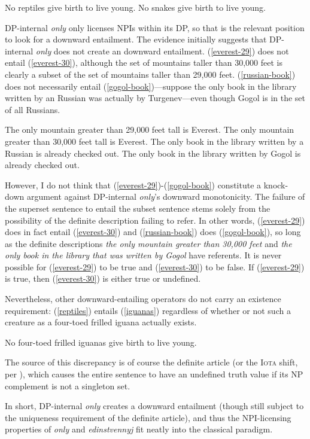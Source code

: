 \begin{exe}
	\ex \label{reptiles} No reptiles give birth to live young.
	\ex \label{snakes} No snakes give birth to live young.
\end{exe}

DP-internal \textit{only} only licenses NPIs within its DP, so that is the relevant position to look for a downward entailment. The evidence initially suggests that DP-internal \textit{only} does not create an downward entailment. (\ref{everest-29}) does not entail (\ref{everest-30}), although the set of mountains taller than 30,000 feet is clearly a subset of the set of mountains taller than 29,000 feet. (\ref{russian-book}) does not necessarily entail (\ref{gogol-book})---suppose the only book in the library written by an Russian was actually by Turgenev---even though Gogol is in the set of all Russians.

\begin{exe}
	\ex \label{everest-29} The only mountain greater than 29,000 feet tall is Everest.
	\ex \label{everest-30} The only mountain greater than 30,000 feet tall is Everest.
	\ex \label{russian-book} The only book in the library written by a Russian is already checked out.
	\ex \label{gogol-book} The only book in the library written by Gogol is already checked out.
\end{exe}

However, I do not think that (\ref{everest-29})-(\ref{gogol-book}) constitute a knock-down argument against DP-internal \textit{only}'s downward monotonicity. The failure of the superset sentence to entail the subset sentence stems solely from the possibility of the definite description failing to refer. In other words, (\ref{everest-29}) does in fact entail (\ref{everest-30}) and (\ref{russian-book}) does (\ref{gogol-book}), so long as the definite descriptions \textit{the only mountain greater than 30,000 feet} and \textit{the only book in the library that was written by Gogol} have referents. It is never possible for (\ref{everest-29}) to be true and (\ref{everest-30}) to be false. If (\ref{everest-29}) is true, then (\ref{everest-30}) is either true or undefined.

Nevertheless, other downward-entailing operators do not carry an existence requirement: (\ref{reptiles}) entails (\ref{iguanas}) regardless of whether or not such a creature as a four-toed frilled iguana actually exists.

\begin{exe}
	\ex \label{iguanas} No four-toed frilled iguanas give birth to live young.
\end{exe}

The source of this discrepancy is of course the definite article (or the \textsc{Iota} shift, per \citeauthor{cb2015}), which causes the entire sentence to have an undefined truth value if its NP complement is not a singleton set.

In short, DP-internal \textit{only} creates a downward entailment (though still subject to the uniqueness requirement of the definite article), and thus the NPI-licensing properties of \textit{only} and \textit{edinstvennyj} fit neatly into the classical paradigm.